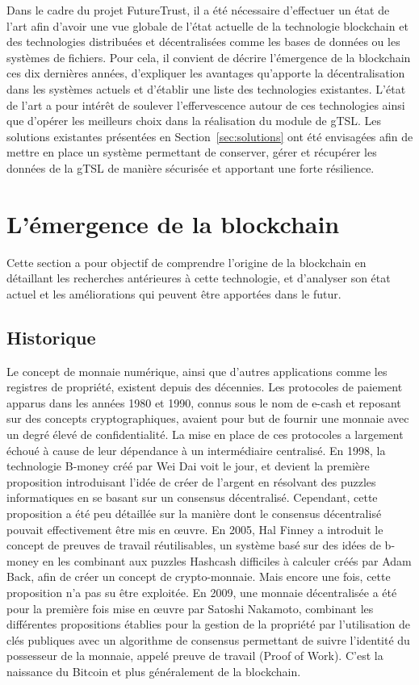 \documentclass{tnreport}
\begin{document}
Dans le cadre du projet FutureTrust, il a été nécessaire d'effectuer un état de l'art afin d'avoir une vue globale de l'état actuelle de la technologie blockchain et des technologies distribuées et décentralisées comme les bases de données ou les systèmes de fichiers. Pour cela, il convient de décrire l'émergence de la blockchain ces dix dernières années, d'expliquer les avantages qu'apporte la décentralisation dans les systèmes actuels et d'établir une liste des technologies existantes. L'état de l'art a pour intérêt de soulever l'effervescence autour de ces technologies ainsi que d'opérer les meilleurs choix dans la réalisation du module de gTSL. Les solutions existantes présentées en Section~\ref{sec:solutions} ont été envisagées afin de mettre en place un système permettant de conserver, gérer et récupérer les données de la gTSL de manière sécurisée et apportant une forte résilience.

\section{L'émergence de la blockchain}

Cette section a pour objectif de comprendre l'origine de la blockchain en détaillant les recherches antérieures à cette technologie, et d'analyser son état actuel et les améliorations qui peuvent être apportées dans le futur.

\subsection{Historique}

Le concept de monnaie numérique, ainsi que d'autres applications comme les registres de propriété, existent depuis des décennies. 
Les protocoles de paiement apparus dans les années 1980 et 1990, connus sous le nom de e-cash\cite{ecash} et reposant sur des concepts cryptographiques, avaient pour but de fournir une monnaie avec un degré élevé de confidentialité. La mise en place de ces protocoles a largement échoué à cause de leur dépendance à un intermédiaire centralisé. 
En 1998, la technologie B-money\cite{bmoney} créé par Wei Dai voit le jour, et devient la première proposition introduisant l'idée de créer de l'argent en résolvant des puzzles informatiques en se basant sur un consensus décentralisé. Cependant, cette proposition a été peu détaillée sur la manière dont le consensus décentralisé pouvait effectivement être mis en œuvre. 
En 2005, Hal Finney a introduit le concept de preuves de travail réutilisables, un système basé sur des idées de b-money en les combinant aux puzzles Hashcash\cite{hashcash} difficiles à calculer créés par Adam Back, afin de créer un concept de crypto-monnaie. Mais encore une fois, cette proposition n'a pas su être exploitée. 
En 2009, une monnaie décentralisée a été pour la première fois mise en œuvre par Satoshi Nakamoto, combinant les différentes propositions établies pour la gestion de la propriété par l'utilisation de clés publiques avec un algorithme de consensus permettant de suivre l'identité du possesseur de la monnaie, appelé preuve de travail (Proof of Work). C'est la naissance du Bitcoin et plus généralement de la blockchain.
\end{document}
